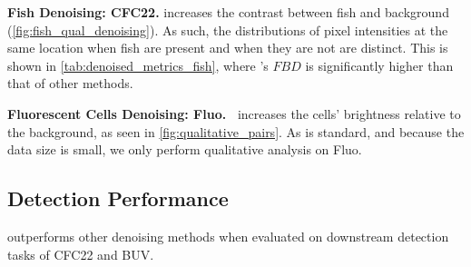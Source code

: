 \noindent{}\textbf{Fish Denoising: CFC22.} \NAME{} increases the contrast between fish and background (\cref{fig:fish_qual_denoising}). As such, the distributions of pixel intensities at the same location when fish are present and when they are not are distinct. This is shown in \cref{tab:denoised_metrics_fish}, where \NAME{}'s $FBD$ is significantly higher than that of other methods.
\begin{table}[t]
    \centering
        \resizebox{0.35\textwidth}{!}{%
            
    }
    \caption{\textbf{\textit{FBD} \cref{eqn:fbd} between P(Fish) vs. Q (Non-fish).} For all ground truth bounding boxes, P and Q are composed as follows: P -- we take the set of pixels in each  box from frames with objects. Q -- we extract the set of pixels from the same box location from a frame where there is no object at that location. \textit{Raw}=raw noisy frame $I_t$, CFC22++\cite{cfc2022eccv} = 3-channel image (raw, background-subtracted, frame-to-frame difference),
    \NAME{}=denoised with motion augmentation, as in \cref{sec:reconstruction}. We calculate the KL-divergence metric, discussed in \cref{sec:KL}. $\uparrow$ indicates the metric is better the larger it is. Best values are \textbf{bolded}, worst values are in \textit{italics.}}
    \label{tab:denoised_metrics_fish}
\end{table}

\noindent{}\textbf{Fluorescent Cells Denoising: Fluo.\ } \NAME{} increases the cells' brightness relative to the background, as seen in \cref{fig:qualitative_pairs}. As is standard\cite{Sheth_2021_ICCV}, and because the data size is small, we only perform qualitative analysis on Fluo.


\subsection{Detection Performance}
\NAME{} outperforms other denoising methods when evaluated on downstream detection tasks of CFC22 and BUV.

